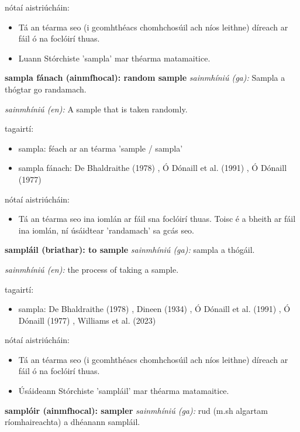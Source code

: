 \documentclass{article}
\begin{document}
nótaí aistriúcháin:
\begin{itemize}
	\item Tá an téarma seo (i gcomhthéacs chomhchosúil ach níos leithne) díreach ar fáil ó na foclóirí thuas.
	\item Luann Stórchiste 'sampla' mar théarma matamaitice.
\end{itemize}


\textbf{sampla fánach (ainmfhocal): random sample}
\textit{sainmhíniú (ga):} Sampla a thógtar go randamach.

\textit{sainmhíniú (en):} A sample that is taken randomly.

tagairtí:
\begin{itemize}
	\item sampla: féach ar an téarma 'sample / sampla'
	\item sampla fánach: De Bhaldraithe (1978) \cite{de-bhaldraithe}, Ó Dónaill et al. (1991) \cite{focloir-beag}, Ó Dónaill (1977) \cite{odonaill}
\end{itemize}

nótaí aistriúcháin:
\begin{itemize}
	\item Tá an téarma seo ina iomlán ar fáil sna foclóirí thuas. Toisc é a bheith ar fáil ina iomlán, ní úsáidtear 'randamach' sa gcás seo.
\end{itemize}


\textbf{sampláil (briathar): to sample}
\textit{sainmhíniú (ga):} sampla a thógáil.

\textit{sainmhíniú (en):} the process of taking a sample.

tagairtí:
\begin{itemize}
	\item sampla: De Bhaldraithe (1978) \cite{de-bhaldraithe}, Dineen (1934) \cite{dineen}, Ó Dónaill et al. (1991) \cite{focloir-beag}, Ó Dónaill (1977) \cite{odonaill}, Williams et al. (2023) \cite{storchiste}
\end{itemize}

nótaí aistriúcháin:
\begin{itemize}
	\item Tá an téarma seo (i gcomhthéacs chomhchosúil ach níos leithne) díreach ar fáil ó na foclóirí thuas.
	\item Úsáideann Stórchiste 'sampláil' mar théarma matamaitice.
\end{itemize}


\textbf{samplóir (ainmfhocal): sampler}
\textit{sainmhíniú (ga):} rud (m.sh algartam ríomhaireachta) a dhéanann sampláil.
\end{document}
